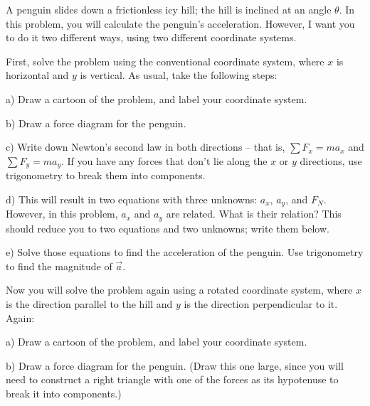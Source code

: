 \documentclass[12pt]{article}
\begin{document}
		\Large
		\centerline{}
		\normalsize
		\centerline{}
		
		A penguin slides down a frictionless icy hill; the hill is inclined at an angle $\theta$. In this problem, you will
		calculate the penguin's acceleration. However, I want you to do it two different ways, using two different coordinate systems.
		
		First, solve the problem using the conventional coordinate system, where $x$ is horizontal and $y$ is vertical. As usual, take the following steps:
		
		a) Draw a cartoon of the problem, and label your coordinate system.
		
		\vspace{2in}
		
		
		b) Draw a force diagram for the penguin.
		
		\vspace{2in}
		
		c) Write down Newton's second law in both directions -- that is, $\sum F_x = ma_x$ and $\sum F_y = ma_y$. If you have any forces that don't lie along the $x$ or $y$ directions, use trigonometry to break them into components.
		
		\vspace{2in}
		\newpage
		d) This will result in two equations with three unknowns: $a_x$, $a_y$, and $F_N$. However, in this problem, $a_x$ and $a_y$ are related. What is their relation? This should reduce you to two equations and two unknowns; write them below.
		\vspace{3in}
		
		e) Solve those equations to find the acceleration of the penguin. Use trigonometry to find the magnitude of $\vec a$.
		
		\newpage
		Now you will solve the problem again using a rotated coordinate system, where $x$ is the direction parallel to the hill and $y$ is the direction perpendicular to it. Again:
		
		a) Draw a cartoon of the problem, and label your coordinate system.
		
		\vspace{2in}
		
		b) Draw a force diagram for the penguin. (Draw this one large, since you will need to construct a right triangle
		with one of the forces as its hypotenuse to break it into components.)
		
		\vspace{3in}
		
\end{document}
